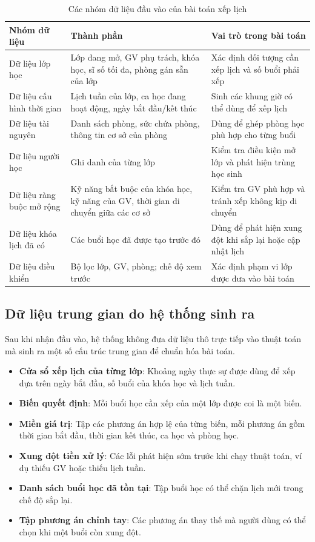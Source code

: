 \documentclass[../DoAn.tex]{subfiles}
\begin{document}
\begin{table}[H]
\centering
\caption{Các nhóm dữ liệu đầu vào của bài toán xếp lịch}
\label{table:bang5.1}
\scriptsize
\begin{tabular}{|p{3cm}|p{4cm}|p{5cm}|}
\hline
\textbf{Nhóm dữ liệu} & \textbf{Thành phần} & \textbf{Vai trò trong bài toán} \\ \hline
Dữ liệu lớp học & Lớp đang mở, GV phụ trách, khóa học, sĩ số tối đa, phòng gán sẵn của lớp & Xác định đối tượng cần xếp lịch và số buổi phải xếp \\ \hline
Dữ liệu cấu hình thời gian & Lịch tuần của lớp, ca học đang hoạt động, ngày bắt đầu/kết thúc & Sinh các khung giờ có thể dùng để xếp lịch \\ \hline
Dữ liệu tài nguyên & Danh sách phòng, sức chứa phòng, thông tin cơ sở của phòng & Dùng để ghép phòng học phù hợp cho từng buổi \\ \hline
Dữ liệu người học & Ghi danh của từng lớp & Kiểm tra điều kiện mở lớp và phát hiện trùng học sinh \\ \hline
Dữ liệu ràng buộc mở rộng & Kỹ năng bắt buộc của khóa học, kỹ năng của GV, thời gian di chuyển giữa các cơ sở & Kiểm tra GV phù hợp và tránh xếp không kịp di chuyển \\ \hline
Dữ liệu khóa lịch đã có & Các buổi học đã được tạo trước đó & Dùng để phát hiện xung đột khi sắp lại hoặc cập nhật lịch \\ \hline
Dữ liệu điều khiển & Bộ lọc lớp, GV, phòng; chế độ xem trước & Xác định phạm vi lớp được đưa vào bài toán \\ \hline
\end{tabular}
\end{table}

\subsection{Dữ liệu trung gian do hệ thống sinh ra}
Sau khi nhận đầu vào, hệ thống không đưa dữ liệu thô trực tiếp vào thuật toán mà sinh ra một số cấu trúc trung gian để chuẩn hóa bài toán.
\begin{itemize}
    \item \textbf{Cửa sổ xếp lịch của từng lớp}: Khoảng ngày thực sự được dùng để xếp dựa trên ngày bắt đầu, số buổi của khóa học và lịch tuần.
    \item \textbf{Biến quyết định}: Mỗi buổi học cần xếp của một lớp được coi là một biến.
    \item \textbf{Miền giá trị}: Tập các phương án hợp lệ của từng biến, mỗi phương án gồm thời gian bắt đầu, thời gian kết thúc, ca học và phòng học.
    \item \textbf{Xung đột tiền xử lý}: Các lỗi phát hiện sớm trước khi chạy thuật toán, ví dụ thiếu GV hoặc thiếu lịch tuần.
    \item \textbf{Danh sách buổi học đã tồn tại}: Tập buổi học có thể chặn lịch mới trong chế độ sắp lại.
    \item \textbf{Tập phương án chỉnh tay}: Các phương án thay thế mà người dùng có thể chọn khi một buổi còn xung đột.
\end{itemize}
\end{document}
